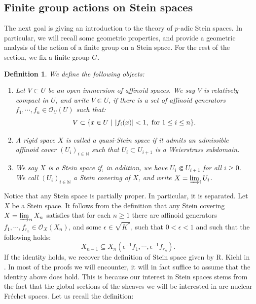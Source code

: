 \documentclass{amsart}
\newtheorem{defi}{ Definition}[subsection]
\newcommand{\OX}{\mathcal{O}}
\begin{document}
\subsection{Finite group actions on Stein spaces}\label{Section group act on Stein spaces}
The next goal is giving an introduction to the theory of $p$-adic Stein spaces. In particular, we will recall some geometric properties, and provide a geometric analysis of the action of a finite group on a Stein space. For the rest of the section, we fix a finite group $G$.
\begin{defi}\label{defi Stein spaces}
We define the following objects:
\begin{enumerate}[label=(\roman*)]
    \item Let $V\subset U$ be an open immersion of affinoid spaces. We say $V$ is relatively compact in $U$, and write $V \Subset U$, if there is a set of affinoid generators $f_1,\cdots, f_n\in \OX_U(U)$ such that:
    \begin{equation*}
        V\subset \{ x\in U \textnormal{ } \vert \textnormal{ } \vert f_i(x)\vert < 1, \textnormal{ for }1\leq i\leq n\}.
    \end{equation*}
    \item A rigid space $X$ is called a quasi-Stein space if it admits an admissible affinoid cover $(U_i)_{i\in\mathbb{N}}$ such that $U_{i}\subset U_{i+1}$ is a Weierstrass subdomain. 
    \item We say $X$ is a Stein space if, in addition, we have $U_i\Subset U_{i+1}$ for all $i\geq 0$. We call $(U_i)_{i\in\mathbb{N}}$ a Stein covering of $X$, and write $X=\varinjlim_iU_i$.
    \end{enumerate}
\end{defi}
Notice that any Stein space is partially proper. In particular, it is separated. Let $X$ be a Stein space. It follows from the definition that any Stein covering $X=\varinjlim_nX_n$ satisfies that for each $n\geq 1$ there are affinoid generators $f_1,\cdots,f_{r_n}\in \OX_X(X_n)$, and some $\epsilon \in \sqrt{K^*}$, such that  $0< \epsilon <1$ and such that the following holds:
\begin{equation}\label{equation special Stein covering}
    X_{n-1}\subseteq X_n\left(\epsilon^{-1} f_1,\cdots, \epsilon^{-1} f_{r_n}\right).
\end{equation}
If the identity holds, we recover the definition of Stein space given by R. Kiehl in \cite[Definition 2.3]{kiehl1967theorem}. In most of the proofs we will encounter, it will in fact suffice to assume that the identity above does hold. This is because our interest in Stein spaces stems from the fact that the global sections of the sheaves we will be interested in are nuclear Fréchet spaces. Let us recall the definition:
\end{document}
